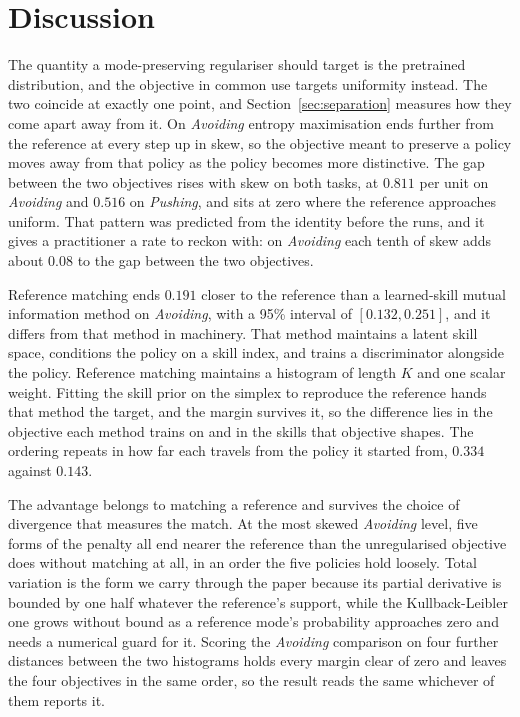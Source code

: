 \documentclass[preprint,12pt]{elsarticle}
\begin{document}
\section{Discussion}\label{sec:discussion}

The quantity a mode-preserving regulariser should target is the pretrained
distribution, and the objective in common use targets uniformity instead. The
two coincide at exactly one point, and Section~\ref{sec:separation} measures how
they come apart away from it. On \emph{Avoiding} entropy maximisation ends
further from the reference at every step up in skew, so the objective meant to
preserve a policy moves away from that policy as the policy becomes more
distinctive. The gap between the two objectives rises with skew on both tasks,
at $0.811$ per unit on \emph{Avoiding} and $0.516$ on \emph{Pushing}, and sits
at zero where the reference approaches uniform. That pattern was predicted from
the identity before the runs, and it gives a practitioner a rate to reckon
with: on \emph{Avoiding} each tenth of skew adds about $0.08$ to the gap
between the two objectives.

Reference matching ends $0.191$ closer to the reference than a learned-skill
mutual information method on \emph{Avoiding}, with a 95\% interval of
$[0.132, 0.251]$, and it differs from that method in machinery. That method
maintains a latent skill space, conditions the policy on a skill index, and
trains a discriminator alongside the policy. Reference matching maintains a
histogram of length $K$ and one scalar weight. Fitting the skill prior on the
simplex to reproduce the reference hands that method the target, and the margin
survives it, so the difference lies in the objective each method trains on and
in the skills that objective shapes. The ordering repeats in how far each
travels from the policy it started from, $0.334$ against $0.143$.

The advantage belongs to matching a reference and survives the choice of
divergence that measures the match. At the most skewed \emph{Avoiding} level,
five forms of the penalty all end nearer the reference than the unregularised
objective does without matching at all, in an order the five policies hold
loosely. Total variation is the form we carry through the paper because its
partial derivative is bounded by one half whatever the reference's support,
while the Kullback-Leibler one grows without bound as a reference mode's
probability approaches zero and needs a numerical guard for it. Scoring the \emph{Avoiding}
comparison on four further distances between the two histograms holds every
margin clear of zero and leaves the four objectives in the same order, so the
result reads the same whichever of them reports it.
\end{document}
